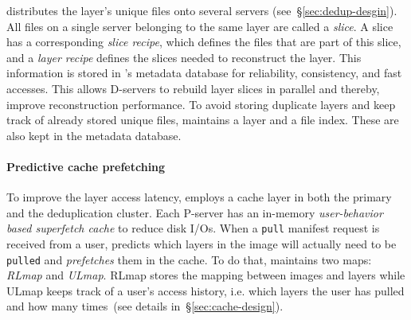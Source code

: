 \sysname distributes the layer's unique files
onto several servers (see~\S\ref{sec:dedup-desgin}).
%
All files on a single server belonging to the same layer are called a \emph{slice}. A slice
has a corresponding \emph{slice recipe}, which defines the files that are part of this slice,
and a \emph{layer recipe} defines the slices needed to reconstruct the layer. This information
is stored in \sysname{}'s metadata database
for reliability, consistency, and fast accesses. 
%
This allows D-servers to rebuild layer slices in parallel and thereby, improve reconstruction
performance.
%
To avoid storing duplicate layers and keep track of already stored unique files,
\sysname maintains a layer and a file index. These are also kept in the metadata database.


\paragraph{Predictive cache prefetching}

To improve the layer access latency, \sysname employs a cache layer in both the
primary and the deduplication cluster.
%
Each P-server has an in-memory \emph{user-behavior based superfetch cache}
to reduce disk I/Os.
%
When a \texttt{pull} manifest request is received from a user,
\sysname predicts which layers in the image will actually need to be \texttt{pulled}
and \emph{prefetches} them in the cache.
To do that, \sysname maintains two maps: \emph{RLmap} and \emph{ULmap}. RLmap
stores the mapping between images and layers while ULmap keeps track of
a user's access history, i.e. which layers the user has pulled and how many
times~(see details in~\S\ref{sec:cache-design}).
%

